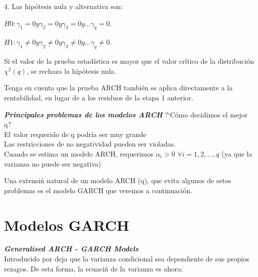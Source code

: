 
	
	4. Las hip\'otesis nula y alternativa son:
	\vspace{2mm}	
	
	$H0 : \gamma_1 = 0 y \gamma_2 = 0 y \gamma_3 = 0 y \dots{} \gamma_q = 0.$
	\vspace{2mm}	
	
	$H1 : \gamma_1 \ne 0 y \gamma_2 \ne 0 y \gamma_3 \ne 0 y \dots{} \gamma_q \ne 0.$
	\vspace{2mm}	
	
	Si el valor de la prueba estad\'{i}stica es mayor que el valor cr\'{i}tico de la distribuci\'on $\chi^2(q)$, se rechaza la hip\'otesis nula.\\
	\vspace{2mm}	
	
	Tenga en cuenta que la prueba ARCH tambi\'en se aplica directamente a la rentabilidad, en lugar de a los residuos de la etapa 1 anterior.
	

	\textit{\textbf{Principales problemas de los modelos ARCH}}
	?`C\'omo decidimos el mejor q?\\
	
	El valor requerido de q podría ser muy grande\\
	
	Las restricciones de no negatividad pueden ser violadas.\\
	
	Cuando se estima un modelo ARCH, requerimos $\alpha_i >0$ $\forall i=1,2,...,q$ (ya que la varianza no puede ser negativa)
	
	Una extensi\'n natural de un modelo ARCH (q), que evita algunos de estos problemas es el modelo GARCH que veremos a continuaci\'on.
	
	

\pagebreak\section{Modelos GARCH}
\textit{\textbf{Generalised ARCH - GARCH Models}}\\
	Introducido por \cite{bollerslev1986generalized} deja que la varianza condicional sea dependiente de sus propios rezagos. De esta forma, la ecuaci\'n de la varianza es ahora:
	
